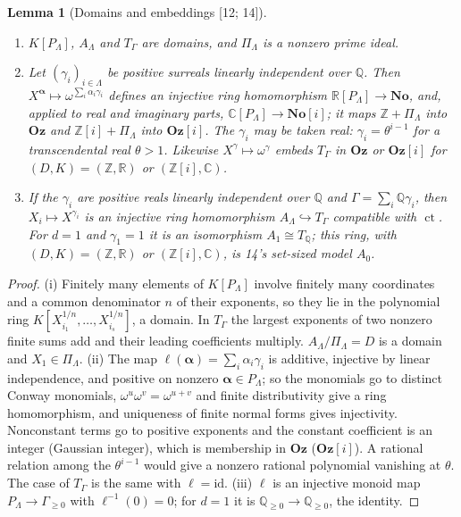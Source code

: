 \documentclass[11pt,letterpaper]{article}
\numberwithin{equation}{section}
\newtheorem{lemma}[lemma]{Lemma}
\theoremstyle{definition}
\theoremstyle{remark}
\theoremstyle{plain}
\newcommand{\No}{\mathbf{No}}
\newcommand{\Oz}{\mathbf{Oz}}
\newcommand{\SC}{\No[i]}
\newcommand{\GOz}{\Oz[i]}
\newcommand{\Z}{\mathbb Z}
\newcommand{\Q}{\mathbb Q}
\newcommand{\R}{\mathbb R}
\newcommand{\C}{\mathbb C}
\newcommand{\ct}{\operatorname{ct}}
\newcommand{\src}[1]{\textup{\textsf{[#1]}}}
\begin{document}
\begin{lemma}[Domains and embeddings \src{12; 14}]\label{osq:hd:lem:cores}
\leavevmode
\begin{enumerate}
\item $K[P_\Lambda]$, $A_\Lambda$ and $T_\Gamma$ are domains, and $\Pi_\Lambda$ is a nonzero prime ideal.
\item Let $(\gamma_i)_{i\in\Lambda}$ be positive surreals linearly independent over $\Q$. Then
$X^{\boldsymbol\alpha}\mapsto\omega^{\sum_i\alpha_i\gamma_i}$ defines an injective ring homomorphism
$\R[P_\Lambda]\to\No$, and, applied to real and imaginary parts, $\C[P_\Lambda]\to\SC$; it maps $\Z+\Pi_\Lambda$
into $\Oz$ and $\Z[i]+\Pi_\Lambda$ into $\GOz$. The $\gamma_i$ may be taken real: $\gamma_i=\theta^{i-1}$ for a
transcendental real $\theta>1$. Likewise $X^\gamma\mapsto\omega^\gamma$ embeds $T_\Gamma$ in $\Oz$ or $\GOz$ for
$(D,K)=(\Z,\R)$ or $(\Z[i],\C)$.
\item If the $\gamma_i$ are positive reals linearly independent over $\Q$ and $\Gamma=\sum_i\Q\gamma_i$, then
$X_i\mapsto X^{\gamma_i}$ is an injective ring homomorphism $A_\Lambda\hookrightarrow T_\Gamma$ compatible with
$\ct$. For $d=1$ and $\gamma_1=1$ it is an isomorphism $A_1\cong T_\Q$; this ring, with $(D,K)=(\Z,\R)$ or
$(\Z[i],\C)$, is 14's set-sized model $A_0$.
\end{enumerate}
\end{lemma}
\begin{proof}
(i) Finitely many elements of $K[P_\Lambda]$ involve finitely many coordinates and a common denominator $n$ of
their exponents, so they lie in the polynomial ring $K[X_{i_1}^{1/n},\dots,X_{i_s}^{1/n}]$, a domain. In $T_\Gamma$
the largest exponents of two nonzero finite sums add and their leading coefficients multiply. $A_\Lambda/\Pi_\Lambda=D$
is a domain and $X_1\in\Pi_\Lambda$. (ii) The map $\ell(\boldsymbol\alpha)=\sum_i\alpha_i\gamma_i$ is additive,
injective by linear independence, and positive on nonzero $\boldsymbol\alpha\in P_\Lambda$; so the monomials go to
distinct Conway monomials, $\omega^u\omega^v=\omega^{u+v}$ and finite distributivity give a ring homomorphism, and
uniqueness of finite normal forms gives injectivity. Nonconstant terms go to positive exponents and the constant
coefficient is an integer (Gaussian integer), which is membership in $\Oz$ ($\GOz$). A rational relation among
the $\theta^{i-1}$ would give a nonzero rational polynomial vanishing at $\theta$. The case of $T_\Gamma$ is the same
with $\ell=\mathrm{id}$. (iii) $\ell$ is an injective monoid map $P_\Lambda\to\Gamma_{\ge0}$ with $\ell^{-1}(0)=0$; for
$d=1$ it is $\Q_{\ge0}\to\Q_{\ge0}$, the identity.
\end{proof}
\end{document}
